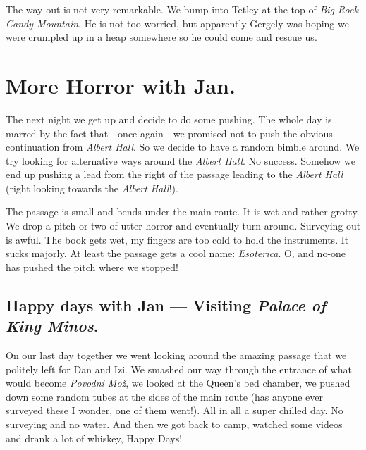 The way out is not very remarkable. We bump into Tetley at the top of
\emph{Big Rock Candy Mountain}. He is not too worried, but apparently
Gergely was hoping we were crumpled up in a heap somewhere so he could
come and rescue us.


\hypertarget{more-horror-with-jan.}{%
\section{More Horror with Jan.}\label{more-horror-with-jan.}}

The next night we get up and decide to do some pushing. The whole day is
marred by the fact that - once again - we promised not to push the
obvious continuation from \emph{Albert Hall}. So we decide to have a
random bimble around. We try looking for alternative ways around the
\emph{Albert Hall}. No success. Somehow we end up pushing a lead from
the right of the passage leading to the \emph{Albert Hall} (right
looking towards the \emph{Albert Hall}!).

The passage is small and bends under the main route. It is wet and
rather grotty. We drop a pitch or two of utter horror and eventually
turn around. Surveying out is awful. The book gets wet, my fingers are
too cold to hold the
instruments.
It sucks majorly. At least the passage gets a cool name:
\emph{Esoterica}. O, and no-one has pushed the pitch where we stopped!


\hypertarget{happy-days-with-jan-visiting-palace-of-king-minos.}{%
\subsection{\texorpdfstring{Happy days with Jan --- Visiting
\emph{Palace of King
Minos}.}{Happy days with Jan --- Visiting Palace of King Minos.}}\label{happy-days-with-jan-visiting-palace-of-king-minos.}}

On our last day together we went looking around the amazing passage that
we politely left for Dan and Izi. We smashed our way through the
entrance of what would become \emph{Povodni Mo\v{z}}, we looked at the
Queen's bed chamber, we pushed down some random tubes at the sides of
the main route (has anyone ever surveyed these I wonder, one of them
went!). All in all a super chilled day. No surveying and no water. And
then we got back to camp, watched some videos and drank a lot of
whiskey, Happy Days!

